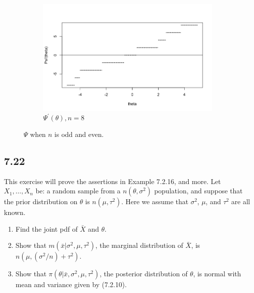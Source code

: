 \documentclass[11pt]{article}
\newcommand{\sample}[1]{#1_1 , \dots , #1_n}
\begin{document}
\begin{figure}[h]
\begin{subfigure}[b]{0.48\textwidth}
     \end{subfigure}
     \hfill
     \begin{subfigure}[b]{0.48\textwidth}
         \centering
         \includegraphics[width=\textwidth]{fig/hw4-4.png}
         \caption{$\Psi^{'}(\theta), n = 8$}

     \end{subfigure}
     \caption{$\Psi$ when $n$ is odd and even.}
    \label{fig:four graphs}
\end{figure}

\subsection*{7.22}
This exercise will prove the assertions in Example 7.2.16, and more. Let $\sample{X}$ be: a random sample from a $n(\theta, \sigma^2)$ population, and suppose that the prior distribution on $\theta$ is $n(\mu, \tau^2)$. Here we assume that $\sigma^2$, $\mu$, and $\tau^2$ are all known.

\begin{enumerate}[label=(\alph*)]
    \item Find the joint pdf of $\bar X$ and $\theta$.
    \item Show that $m(\bar x| \sigma^2, \mu, \tau^2)$, the marginal distribution of $\bar X$, is $n(\mu, (\sigma^2/n) + \tau^2)$.
    \item Show that $\pi(\theta|\bar x, \sigma^2, \mu, \tau^2)$, the posterior distribution of $\theta$, is normal with mean and variance given by (7.2.10).
\end{enumerate}
\end{document}

